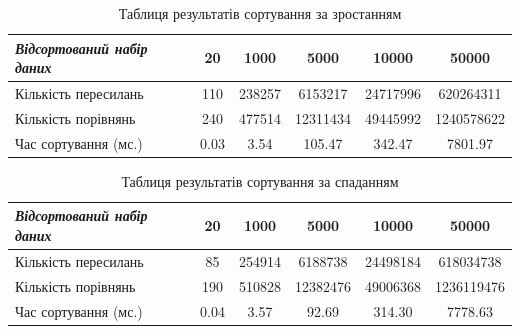 \begin{table}[htbp]
  \caption{Таблиця результатів сортування за зростанням}
  \begin{tabular}{|l|c|c|c|c|c|}
  \hline
  \textit{Відсортований набір даних} & 20   & 1000   & 5000     & 10000    & 50000      \\ \hline
  Кількість пересилань               & 110  & 238257 & 6153217  & 24717996 & 620264311  \\ \hline
  Кількість порівнянь                & 240  & 477514 & 12311434 & 49445992 & 1240578622 \\ \hline
  Час сортування (мс.)               & 0.03 & 3.54   & 105.47   & 342.47   & 7801.97    \\ \hline
  \end{tabular}
\end{table}

\begin{table}[htbp]
  \caption{Таблиця результатів сортування за спаданням}
  \begin{tabular}{|l|c|c|c|c|c|}
  \hline
  \textit{Відсортований набір даних} & 20   & 1000   & 5000     & 10000    & 50000      \\ \hline
  Кількість пересилань               & 85   & 254914 & 6188738  & 24498184 & 618034738  \\ \hline
  Кількість порівнянь                & 190  & 510828 & 12382476 & 49006368 & 1236119476 \\ \hline
  Час сортування (мс.)               & 0.04 & 3.57   & 92.69    & 314.30   & 7778.63    \\ \hline
  \end{tabular}
\end{table}


